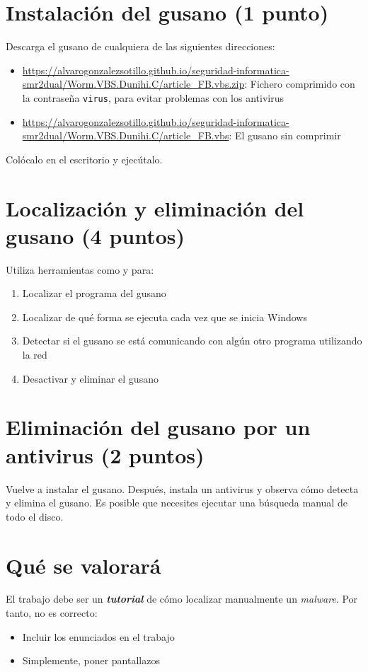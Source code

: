 \section{Instalación del gusano (1 punto)}
Descarga el gusano de cualquiera de las siguientes direcciones:
\begin{itemize}
\item \url{https://alvarogonzalezsotillo.github.io/seguridad-informatica-smr2dual/Worm.VBS.Dunihi.C/article_FB.vbs.zip}: Fichero comprimido con la contraseña \texttt{virus}, para evitar problemas con los antivirus
\item \url{https://alvarogonzalezsotillo.github.io/seguridad-informatica-smr2dual/Worm.VBS.Dunihi.C/article_FB.vbs}: El gusano sin comprimir
\end{itemize}

Colócalo en el escritorio y ejecútalo.

\section{Localización y eliminación del gusano (4 puntos)}
Utiliza herramientas como  y  para:
\begin{enumerate}
\item Localizar el programa del gusano
\item Localizar de qué forma se ejecuta cada vez que se inicia Windows
\item Detectar si el gusano se está comunicando con algún otro programa utilizando la red
\item Desactivar y eliminar el gusano
\end{enumerate}

\section{Eliminación del gusano por un antivirus (2 puntos)}
Vuelve a instalar el gusano. Después, instala un antivirus y observa cómo detecta y elimina el gusano. Es posible que necesites ejecutar una búsqueda manual de todo el disco.




\section{Qué se valorará}
El trabajo debe ser un \textit{\textbf{tutorial}} de cómo localizar manualmente un \textit{malware}. Por tanto, no es correcto:
\begin{itemize}
\item Incluir los enunciados en el trabajo
\item Simplemente, poner pantallazos
\end{itemize}


